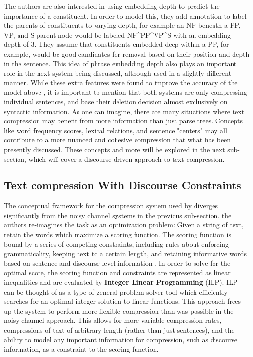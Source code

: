 {The authors are also interested in using embedding depth to predict the importance of a constituent.  In order to model this, they add annotation to label the parents of constituents to varying depth, for example an NP beneath a PP, VP, and S parent node would be labeled NP\^{}PP\^{}VP\^{}S with an embedding depth of 3.  They assume that constituents embedded deep within a PP, for example, would be good candidates for removal based on their position and depth in the sentence.  This idea of phrase embedding depth also plays an important role in the next system being discussed, although used in a slightly different manner.  While these extra features were found to improve the  accuracy of the \citet{galley2007lexicalized} model above \citet{knight2000statistics}, it is important to mention that both systems are only compressing individual sentences, and base their deletion decision almost exclusively on syntactic information. As one can imagine, there are many situations where text compression may benefit from more information than just parse trees. Concepts like word frequency scores, lexical relations, and sentence "centers" may all contribute to a more nuanced and cohesive compression that what has been presently discussed.  These concepts and more will be explored in the next sub-section, which will cover a discourse driven approach to text compression.}




\subsection{Text compression With Discourse Constraints}
  

{The conceptual framework for the compression system used by \citet{Clarke:2010:DCD:1950488.1950493} diverges significantly from the noisy channel systems in the previous sub-section.  the authors re-imagines the task as an optimization problem:  Given a string of text, retain the words which maximize a scoring function.  The scoring function is bound by a series of competing constraints, including rules about enforcing grammaticality, keeping text to a certain length, and retaining informative words based on sentence and discourse level information \citep{Clarke:2010:DCD:1950488.1950493}.  In order to solve for the optimal score, the scoring function and constraints are represented as linear inequalities and are evaluated by \textbf{Integer Linear Programming} (ILP).  ILP can be thought of as a type of general problem solver tool which efficiently searches for an optimal integer solution to linear functions.  This approach frees up the system to perform more flexible compression than was possible in the noisy channel approach. This allows for more variable compression rates, compressions of text of arbitrary length (rather than just sentences), and the ability to model any important information for compression, such as discourse information, as a constraint to the scoring function.} 

